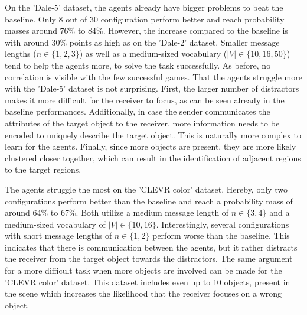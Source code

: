 On the 'Dale-5' dataset, the agents already have bigger problems to beat the baseline.
Only 8 out of 30 configuration perform better and reach probability masses around 76\% to 84\%.
However, the increase compared to the baseline is with around 30\% points as high as on the 'Dale-2' dataset.
Smaller message lengths ($n \in \{1,2,3\}$) as well as a medium-sized vocabulary ($|V| \in \{10,16,50\}$) tend to help the agents more, to solve the task successfully.
As before, no correlation is visible with the few successful games.
That the agents struggle more with the 'Dale-5' dataset is not surprising.
First, the larger number of distractors makes it more difficult for the receiver to focus, as can be seen already in the baseline performances.
Additionally, in case the sender communicates the attributes of the target object to the receiver, more information needs to be encoded to uniquely describe the target object.
This is naturally more complex to learn for the agents.
Finally, since more objects are present, they are more likely clustered closer together, which can result in the identification of adjacent regions to the target regions.

The agents struggle the most on the 'CLEVR color' dataset.
Hereby, only two configurations perform better than the baseline and reach a probability mass of around 64\% to 67\%.
Both utilize a medium message length of $n \in \{3,4\}$ and a medium-sized vocabulary of $|V| \in \{10,16\}$.
Interestingly, several configurations with short message lengths of $n \in \{1,2\}$ perform worse than the baseline.
This indicates that there is communication between the agents, but it rather distracts the receiver from the target object towards the distractors.
The same argument for a more difficult task when more objects are involved can be made for the 'CLEVR color' dataset.
This dataset includes even up to 10 objects, present in the scene which increases the likelihood that the receiver focuses on a wrong object.


